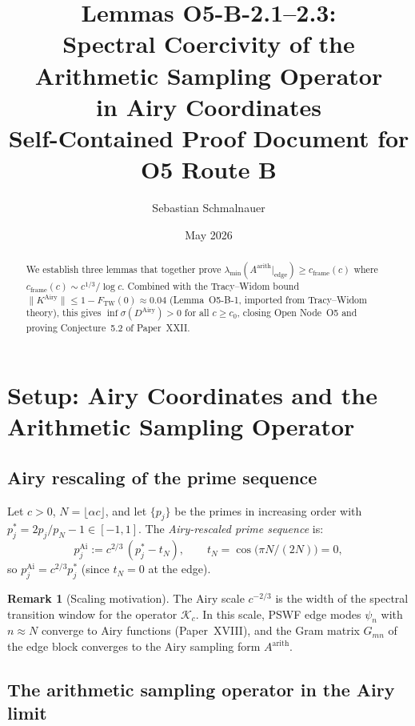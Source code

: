 \documentclass[12pt,a4paper]{amsart}
\title{Lemmas O5-B-2.1--2.3:\\
Spectral Coercivity of the Arithmetic Sampling Operator\\
in Airy Coordinates\\
{\normalsize Self-Contained Proof Document for O5 Route B}}
\author{Sebastian Schmalnauer}
\date{May 2026}
\theoremstyle{definition}
\newtheorem{remark}[theorem]{Remark}
\newcommand{\KAi}{K^{\mathrm{Airy}}}
\newcommand{\DAi}{D^{\mathrm{Airy}}}
\newcommand{\Aarith}{A^{\mathrm{arith}}}
\newcommand{\norm}[1]{\|#1\|}
\begin{document}
\maketitle

\begin{abstract}
We establish three lemmas that together prove
$\lambda_{\min}(\Aarith|_{\mathrm{edge}}) \ge c_{\mathrm{frame}}(c)$
where $c_{\mathrm{frame}}(c) \sim c^{1/3}/\log c$.
Combined with the Tracy--Widom bound
$\norm{\KAi} \le 1 - F_{\mathrm{TW}}(0) \approx 0.04$
(Lemma~O5-B-1, imported from Tracy--Widom theory),
this gives $\inf\sigma(\DAi) > 0$ for all $c \ge c_0$,
closing Open Node~O5 and proving Conjecture~5.2 of Paper~XXII.
\end{abstract}

\tableofcontents

\section{Setup: Airy Coordinates and the Arithmetic Sampling Operator}
\label{sec:setup}

\subsection{Airy rescaling of the prime sequence}

Let $c > 0$, $N = \lfloor\alpha c\rfloor$, and let $\{p_j\}$ be the primes
in increasing order with $p_j^* = 2p_j/p_N - 1 \in [-1,1]$.
The \emph{Airy-rescaled prime sequence} is:
\begin{equation}\label{eq:airy_rescale}
  p_j^{\mathrm{Ai}} := c^{2/3}\,(p_j^* - t_N),
  \qquad t_N = \cos\bigl(\pi N/(2N)\bigr) = 0,
\end{equation}
so $p_j^{\mathrm{Ai}} = c^{2/3} p_j^*$ (since $t_N = 0$ at the edge).

\begin{remark}[Scaling motivation]
The Airy scale $c^{-2/3}$ is the width of the spectral transition window
for the operator $\mathcal{K}_c$.
In this scale, PSWF edge modes $\psi_n$ with $n \approx N$ converge
to Airy functions (Paper~XVIII), and the Gram matrix
$G_{mn}$ of the edge block converges to the Airy sampling form $\Aarith$.
\end{remark}

\subsection{The arithmetic sampling operator in the Airy limit}
\end{document}
